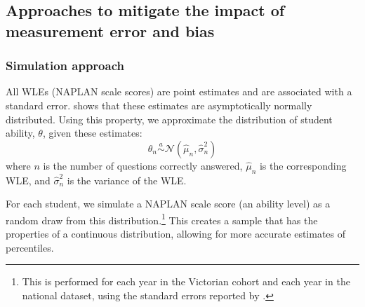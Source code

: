 \subsection{Approaches to mitigate the impact of measurement error and bias} \label{sec:pv}

\subsubsection*{Simulation approach}

All WLEs (NAPLAN scale scores) are point estimates and are associated with a standard error. \textcite{warm1989} shows that these estimates are asymptotically normally distributed. Using this property, we approximate the distribution of student ability, $\theta$, given these estimates:
\begin{equation}
\theta_{n} \overset{a}\sim \mathcal{N}\left(\widehat{\mu}_{n},\widehat{\sigma}_{n}^{2} \right)
\end{equation}
where $n$ is the number of questions correctly answered, $\widehat{\mu}_{n}$ is the corresponding WLE, and $\widehat{\sigma}_{n}^{2}$ is the variance of the WLE. 

For each student, we simulate a NAPLAN scale score (an ability level) as a random draw from this distribution.\footnote{This is performed for each year in the Victorian cohort and each year in the national dataset, using the standard errors reported by \textcite{acara2015d}.} This creates a sample that has the properties of a continuous distribution, allowing for more accurate estimates of percentiles.

